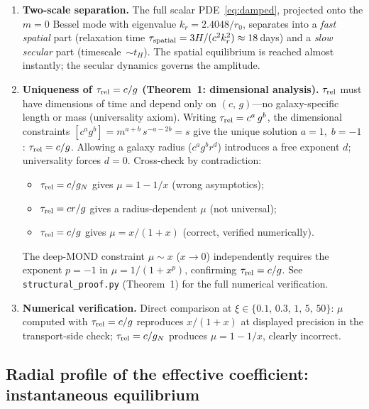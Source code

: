 \documentclass[11pt]{article}
\begin{document}
\begin{enumerate}
\item \textbf{Two-scale separation.}
The full scalar PDE~\eqref{eq:damped}, projected onto the $m=0$
Bessel mode with eigenvalue $k_r=2.4048/r_0$, separates into
a \emph{fast spatial} part (relaxation time
$\tau_{\rm spatial}=3H/(c^2 k_r^2)\approx 18\,$days) and a
\emph{slow secular} part (timescale~$\sim t_H$).
The spatial equilibrium is reached almost instantly; the
secular dynamics governs the amplitude.

\item \textbf{Uniqueness of $\tau_{\rm rel}=c/g$
  (Theorem~1: dimensional analysis).}
$\tau_{\rm rel}$ must have dimensions of time and depend
only on $(c,\,g)$---no galaxy-specific length or mass
(universality axiom).  Writing $\tau_{\rm rel}=c^a\,g^b$,
the dimensional constraints
$[c^a g^b]=m^{a+b}\,s^{-a-2b}=s$
give the unique solution $a=1,\;b=-1$:
$\tau_{\rm rel}=c/g$.
Allowing a galaxy radius ($c^a g^b r^d$) introduces
a free exponent $d$; universality forces $d=0$.
Cross-check by contradiction:
\begin{itemize}
\item $\tau_{\rm rel}=c/g_N$ gives $\mu=1-1/x$ (wrong asymptotics);
\item $\tau_{\rm rel}=cr/g$ gives a radius-dependent $\mu$ (not universal);
\item $\tau_{\rm rel}=c/g$ gives $\mu=x/(1+x)$ (correct, verified numerically).
\end{itemize}
The deep-MOND constraint $\mu\sim x$ ($x\to0$) independently
requires the exponent $p=-1$ in $\mu=1/(1+x^p)$, confirming
$\tau_{\rm rel}=c/g$.  See \nolinkurl{structural_proof.py}
(Theorem~1) for the full numerical verification.

\item \textbf{Numerical verification.}
Direct comparison at $\xi\in\{0.1,\,0.3,\,1,\,5,\,50\}$:
$\mu$ computed with $\tau_{\rm rel}=c/g$ reproduces
$x/(1+x)$ at displayed precision in the transport-side
check; $\tau_{\rm rel}=c/g_N$
produces $\mu=1-1/x$, clearly incorrect.
\end{enumerate}

\subsection{Radial profile of the effective coefficient: instantaneous equilibrium}
\label{sec:ceff_profile}
\end{document}
